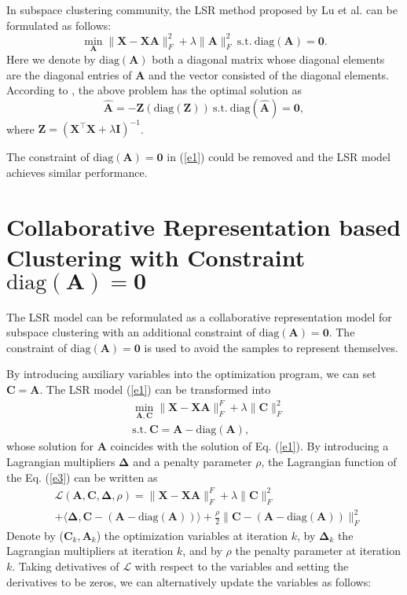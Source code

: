 \documentclass[10pt,twocolumn,letterpaper]{article}
\begin{document}
In subspace clustering community, the LSR method \cite{lsr} proposed by Lu et al. can be formulated as follows:
\begin{equation}
\label{e3}
\min_{\bm{A}}
\|
\bm{X}
-
\bm{X}\bm{A}
\|_{F}^{2}
+
\lambda
\|
\bm{A}
\|_{F}^{2}
\ 
\text{s.t.}
\ 
\text{diag}(\bm{A})=\bm{0}.
\end{equation}
Here we denote by $\text{diag}(\bm{A})$ both a diagonal matrix whose diagonal elements are the diagonal entries of $\bm{A}$ and the vector consisted of the diagonal elements. According to \cite{lsr}, the above problem has the optimal solution as 
\begin{equation}
\label{e4}
\hat{\bm{A}}
=
-\bm{\bm{Z}}(\text{diag}(\bm{Z}))
\
\text{s.t.} 
\
\text{diag}(\hat{\bm{A}})=\bm{0}
,
\end{equation}
where $\bm{Z}=(\bm{X}^{\top}\bm{X}+\lambda\bm{I})^{-1}$.

The constraint of  $\text{diag}(\bm{A})=\bm{0}$ in (\ref{e1}) could be removed and the LSR model achieves similar performance.


\section{Collaborative Representation based Clustering with Constraint $\text{diag}(\bm{A})=\bm{0}$}
The LSR model can be reformulated as a collaborative representation model \cite{crc} for subspace clustering with an additional constraint of $\text{diag}(\bm{A})=\bm{0}$. The constraint of $\text{diag}(\bm{A})=\bm{0}$ is used to avoid the samples to represent themselves.

By introducing auxiliary variables into the optimization program, we can set 
$
\bm{C}
=
\bm{A}
$.
The LSR model (\ref{e1}) can be transformed into
\begin{equation}
\begin{split}
\label{e5}
&
\min_{\bm{A},\bm{C}}
\|
\bm{X}
-
\bm{X}\bm{A}
\|_{F}^{F}
+
\lambda
\|
\bm{C}
\|_{F}^{2}
\\
& 
\text{s.t.}
\ 
\bm{C}=\bm{A}-\text{diag}(\bm{A})
,
\end{split}
\end{equation}
whose solution for $\bm{A}$ coincides with the solution of Eq. (\ref{e1}). By introducing a Lagrangian multipliers $\bm{\Delta}$ and a penalty parameter $\rho$, the Lagrangian function of the Eq. (\ref{e3}) can be written as
\begin{equation}
\begin{split}
\label{e6}
&
\mathcal{L}
(\bm{A},\bm{C},\bm{\Delta},\rho)
=
\|
\bm{X}
-
\bm{X}\bm{A}
\|_{F}^{F}
+
\lambda
\|
\bm{C}
\|_{F}^{2}
\\
&
+
\langle
\bm{\Delta},
\bm{C}-(\bm{A}-\text{diag}(\bm{A}))
\rangle
+
\frac{\rho}{2}
\|
\bm{C}-(\bm{A}-\text{diag}(\bm{A}))
\|_{F}^{2}
\end{split}
\end{equation}
Denote by ($\bm{C}_{k},\bm{A}_{k}$) the optimization variables at iteration $k$, by $\bm{\Delta}_{k}$ the Lagrangian multipliers at iteration $k$, and by $\rho$ the penalty parameter at iteration $k$. Taking detivatives of $\mathcal{L}$ with respect to the variables and setting the derivatives to be zeros, we can alternatively update the variables as follows:
\end{document}
